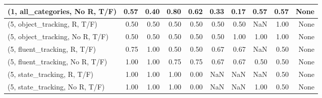 \begin{table*}[h!]
\begin{adjustbox}{width=2\columnwidth,center}
\begin{tabular}{lrrr|rrr|rrr}
(1, all\_categories, No R, T/F)       &                      0.57 &                  0.40 &                      0.80 &                          0.62 &                      0.33 &                          0.17 &                                   0.57 &                               0.57 &                                  None \\



\midrule
(5, object\_tracking, R, T/F)         &                      0.50 &                  0.50 &                      0.50 &                          0.50 &                      0.50 &                          0.50 &                                    NaN &                               1.00 &                                  None \\
(5, object\_tracking, No R, T/F)      &                      0.50 &                  0.50 &                      0.50 &                          0.50 &                      0.50 &                          1.00 &                                   1.00 &                               1.00 &                                  None \\
(5, fluent\_tracking, R, T/F)         &                      0.75 &                  1.00 &                      0.50 &                          0.50 &                      0.67 &                          0.67 &                                    NaN &                               0.50 &                                  None \\
(5, fluent\_tracking, No R, T/F)      &                      1.00 &                  1.00 &                      0.75 &                          0.75 &                      0.67 &                          0.67 &                                   0.50 &                               0.50 &                                  None \\
(5, state\_tracking, R, T/F)          &                      1.00 &                  1.00 &                      1.00 &                          0.00 &                       NaN &                           NaN &                                    NaN &                               0.50 &                                  None \\
(5, state\_tracking, No R, T/F)       &                      1.00 &                  1.00 &                      1.00 &                          0.00 &                       NaN &                           NaN &                                   1.00 &                               0.50 &                                  None \\

\end{tabular}
\end{adjustbox}
\end{table*}
